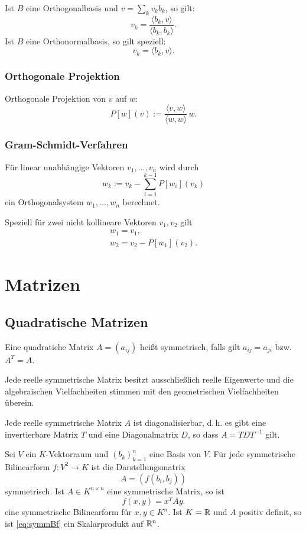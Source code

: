 Ist $B$ eine Orthogonalbasis und $v=\sum_k v_k b_k$, so gilt:
\begin{equation}
v_k = \frac{\langle b_k,v\rangle}{\langle b_k,b_k\rangle}.
\end{equation}
Ist $B$ eine Orthonormalbasis, so gilt speziell:
\begin{equation}
v_k = \langle b_k,v\rangle.
\end{equation}


\subsubsection{Orthogonale Projektion}
Orthogonale Projektion von $v$ auf $w$:
\begin{equation}
P[w](v) := \frac{\langle v,w\rangle}{\langle w,w\rangle}\,w.
\end{equation}
\subsubsection{Gram-Schmidt-Verfahren}
Für linear unabhängige Vektoren $v_1,\ldots,v_n$
wird durch%
\begin{equation}
w_k := v_k - \sum_{i=1}^{k-1} P[w_i](v_k)
\end{equation}
ein Orthogonalsystem $w_1,\ldots,w_n$ berechnet.

Speziell für zwei nicht kollineare Vektoren $v_1,v_2$ gilt
\begin{gather}
w_1=v_1,\\
w_2=v_2-P[w_1](v_2).
\end{gather}

\section{Matrizen}
\subsection{Quadratische Matrizen}
Eine quadratiche Matrix $A=(a_{ij})$ heißt symmetrisch,
falls gilt $a_{ij}=a_{ji}$ bzw. $A^T=A$.

Jede reelle symmetrische Matrix besitzt ausschließlich reelle
Eigenwerte und die algebraischen Vielfachheiten stimmen mit den
geometrischen Vielfachheiten überein.

Jede reelle symmetrische Matrix $A$ ist diagonalisierbar, d.\,h. es gibt
eine invertierbare Matrix $T$ und eine Diagonalmatrix $D$, so dass
$A=TDT^{-1}$ gilt.

Sei $V$ ein $K$-Vektorraum und $(b_k)_{k=1}^n$ eine Basis von $V$.
Für jede symmetrische Bilinearform $f\colon V^2\to K$ ist die
Darstellungsmatrix
\begin{equation}
A = (f(b_i,b_j))
\end{equation}
symmetrisch. Ist $A\in K^{n\times n}$ eine symmetrische Matrix, so
ist
\begin{equation}\label{eq:symmBf}
f(x,y) = x^T A y.
\end{equation}
eine symmetrische Bilinearform für  $x,y\in K^n$.
Ist $K=\mathbb R$ und $A$ positiv definit, so ist
\eqref{eq:symmBf} ein Skalarprodukt auf $\mathbb R^n$.


